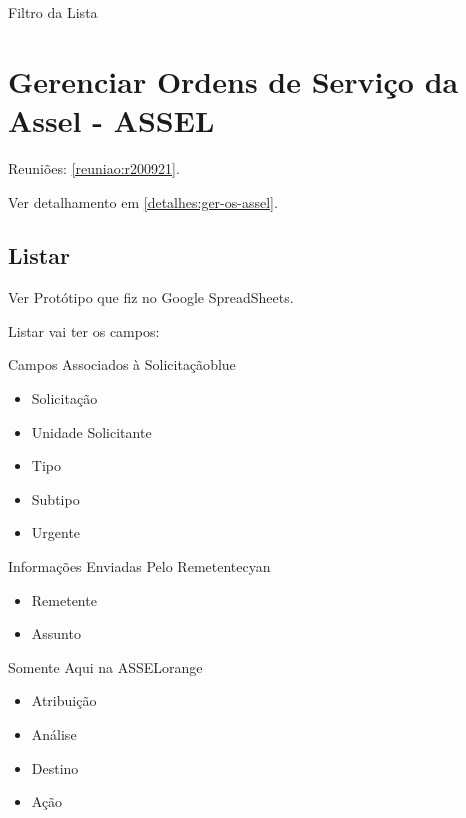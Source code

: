 	Filtro da Lista



	
	
	
	

\section{Gerenciar Ordens de Serviço da Assel \msrln - ASSEL}
\label{tela:ger-os-assel}

	Reuniões: \ref{reuniao:r200921}.
	
	Ver detalhamento em \ref{detalhes:ger-os-assel}.
	

	\subsection{Listar}
		Ver Protótipo que fiz no Google SpreadSheets.
		
		Listar vai ter os campos:
		
		\begin{env-cor}{Campos Associados à Solicitação}{blue}
			\begin{itemize}
				\item Solicitação
				\item Unidade Solicitante
				\item Tipo
				\item Subtipo
				\item Urgente
			\end{itemize}
		\end{env-cor}
		
		\begin{env-cor}{Informações Enviadas Pelo Remetente}{cyan}
			\begin{itemize}
				\item Remetente
				\item Assunto	
			\end{itemize}
		\end{env-cor}
				
		\begin{env-cor}{Somente Aqui na ASSEL}{orange}
			\begin{itemize}
				\item Atribuição
				\item Análise
				\item Destino
				\item Ação	
			\end{itemize}
		\end{env-cor}


